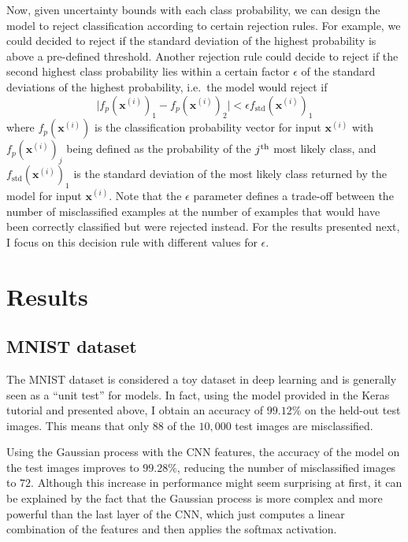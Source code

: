 \documentclass{article}
\begin{document}
Now, given uncertainty bounds with each class probability, we can design the model to reject classification according to certain rejection rules. For example, we could decided to reject if the standard deviation of the highest probability is above a pre-defined threshold. Another rejection rule could decide to reject if the second highest class probability lies within a certain factor $\epsilon$ of the standard deviations of the highest probability, i.e.\ the model would reject if
\begin{equation*}
	\vert f_p(\mathbf{x}^{(i)})_1 - f_p(\mathbf{x}^{(i)})_2 \vert < \epsilon f_{\textrm{std}}(\mathbf{x}^{(i)})_1
\end{equation*}
where $f_p(\mathbf{x}^{(i)})$ is the classification probability vector for input $\mathbf{x}^{(i)}$ with $f_p(\mathbf{x}^{(i)})_j$ being defined as the probability of the $j\textsuperscript{th}$ most likely class, and $f_{\textrm{std}}(\mathbf{x}^{(i)})_1$ is the standard deviation of the most likely class returned by the model for input $\mathbf{x}^{(i)}$. Note that the $\epsilon$ parameter defines a trade-off between the number of misclassified examples at the number of examples that would have been correctly classified but were rejected instead. For the results presented next, I focus on this decision rule with different values for $\epsilon$.
\section{Results}
\subsection{MNIST dataset}
The MNIST dataset is considered a toy dataset in deep learning and is generally seen as a ``unit test'' for models. In fact, using the model provided in the Keras tutorial and presented above, I obtain an accuracy of $99.12\%$ on the held-out test images. This means that only $88$ of the $10,000$ test images are misclassified.

Using the Gaussian process with the CNN features, the accuracy of the model on the test images improves to $99.28\%$, reducing the number of misclassified images to $72$. Although this increase in performance might seem surprising at first, it can be explained by the fact that the Gaussian process is more complex and more powerful than the last layer of the CNN, which just computes a linear combination of the features and then applies the softmax activation.
\end{document}
